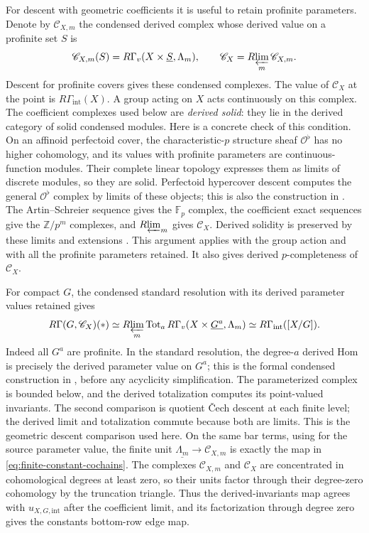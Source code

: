 \documentclass[11pt]{article}
\numberwithin{equation}{section}
\theoremstyle{definition}
\theoremstyle{remark}
\newcommand{\Z}{\mathbb Z}
\newcommand{\F}{\mathbb F}
\newcommand{\cO}{\mathcal O}
\newcommand{\Rlim}{R\!\varprojlim}
\begin{document}
For descent with geometric coefficients it is useful to retain
profinite parameters.  Denote by $\mathscr C_{X,m}$ the condensed
derived complex whose derived value on a profinite set $S$ is
\[
 \mathscr C_{X,m}(S)=R\Gamma_v(X\times\underline S,\Lambda_m),
 \qquad \mathscr C_X=\Rlim_m\mathscr C_{X,m}.
\]
Descent for profinite covers gives these condensed complexes.  The value
of $\mathscr C_X$ at the point is $R\Gamma_{\mathrm{int}}(X)$.
A group acting on $X$ acts continuously
on this complex.  The coefficient complexes used below are
\emph{derived solid}: they lie in the derived category of solid
condensed modules.  Here is a concrete check of this condition.
On an affinoid perfectoid cover, the characteristic-$p$ structure
sheaf $\cO^\flat$ has no higher cohomology, and its values with
profinite parameters are continuous-function modules.  Their complete
linear topology expresses them as limits of discrete modules, so
they are solid.  Perfectoid hypercover descent computes the general
$\cO^\flat$ complex by limits of these objects; this is also the
construction in \cite[Theorem~3.2.1(iii) and Remark~3.2.2]{BMR2026}.
The Artin--Schreier
sequence gives the $\F_p$ complex, the coefficient exact sequences
give the $\Z/p^m$ complexes, and $\Rlim_m$ gives $\mathscr C_X$.
Derived solidity is preserved by these limits and extensions
\cite[Theorem~4.4(ii)]{Tang2026}.  This argument applies with the
group action and with all the profinite parameters retained.  It
also gives derived $p$-completeness of $\mathscr C_X$.

For compact $G$, the condensed standard resolution with its derived
parameter values retained gives
\begin{equation}\label{eq:geometric-group-descent}
 R\Gamma(G,\mathscr C_X)(*)\simeq
 \Rlim_m\operatorname{Tot}_{a}R\Gamma_v
        (X\times\underline{G^a},\Lambda_m)
 \simeq R\Gamma_{\mathrm{int}}([X/G]).
\end{equation}
Indeed all $G^a$ are profinite.  In the standard resolution, the
degree-$a$ derived Hom is precisely the derived parameter value on
$G^a$; this is the formal condensed construction in
\cite[\S2, pp.~5--6]{Anschutz2020}, before any acyclicity simplification.
The parameterized complex is bounded below, and the derived
totalization computes its point-valued invariants.  The second
comparison is quotient \v{C}ech descent at each finite level; the
derived limit and totalization commute because both are limits.
This is the geometric descent comparison used here.  On the same bar
terms, using \cite[Lemma~2.2]{Anschutz2020} for the source parameter
value, the finite unit $\underline{\Lambda_m}\to\mathscr C_{X,m}$
is exactly the map in \eqref{eq:finite-constant-cochains}.  The complexes
$\mathscr C_{X,m}$ and $\mathscr C_X$ are concentrated in cohomological
degrees at least zero, so their units factor through their degree-zero
cohomology by the truncation triangle.  Thus the derived-invariants map
agrees with $u_{X,G,\mathrm{int}}$ after the coefficient limit, and its
factorization through degree zero gives the constants bottom-row edge map.
\end{document}
